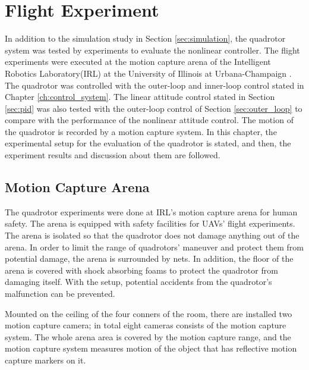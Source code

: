 \section{Flight Experiment}
\label{sec:experiment}

In addition to the simulation study in Section \ref{sec:simulation}, the quadrotor system was tested by experiments to evaluate the nonlinear controller. The flight experiments were executed at the motion capture arena of the Intelligent Robotics Laboratory(IRL) at the University of Illinois at Urbana-Champaign \cite{irl}. The quadrotor was controlled with the outer-loop and inner-loop control stated in Chapter \ref{ch:control_system}. The linear attitude control stated in Section \ref{sec:pid} was also tested with the outer-loop control of Section \ref{sec:outer_loop} to compare with the performance of the nonlinear attitude control. The motion of the quadrotor is recorded by a motion capture system. 
In this chapter, the experimental setup for the evaluation of the quadrotor is stated, and then, the experiment results and discussion about them are followed.

\subsection{Motion Capture Arena}

The quadrotor experiments were done at IRL's motion capture arena for human safety. The arena is equipped with safety facilities for UAVs' flight experiments. The arena is isolated so that the quadrotor does not damage anything out of the arena. In order to limit the range of quadrotors' maneuver and protect them from potential damage, the arena is surrounded by nets. In addition, the floor of the arena is covered with shock absorbing foams to protect the quadrotor from damaging itself. With the setup, potential accidents from the quadrotor's malfunction can be prevented.

Mounted on the ceiling of the four conners of the room, there are installed two motion capture camera; in total eight cameras consists of the motion capture system. The whole arena area is covered by the motion capture range, and the motion capture system measures motion of the object that has reflective motion capture markers on it.

